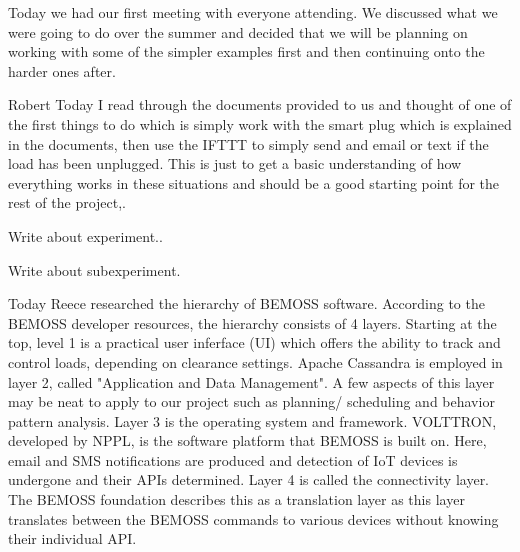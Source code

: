 \documentclass[fontsize=11pt, %
                             paper=letter, %
                             twoside, %
                             captions=tableheading,
                             index=totoc,
                             hyperref]{labbook}
\begin{document}
\begin{addmargin}[0cm]{0cm} %

\pagestyle{scrheadings} %




Today we had our first meeting with everyone attending. We discussed what we were going to do over the summer and decided that we will be planning on working with some of the simpler examples first and then continuing onto the harder ones after.

Robert \newline 
Today I read through the documents provided to us and thought of one of the first things to do which is simply work with the smart plug which is explained in the documents, then use the IFTTT to simply send and email or text if the load has been unplugged. This is just to get a basic understanding of how everything works in these situations and should be a good starting point for the rest of the project,.


Write about experiment..




Write about subexperiment. 

 
\end{addmargin}

Today Reece researched the hierarchy of BEMOSS software. According to the BEMOSS developer resources, the hierarchy consists of 4 layers. Starting at the top, level 1 is a practical user inferface (UI) which offers the ability to track and control loads, depending on clearance settings. Apache Cassandra is employed in layer 2, called "Application and Data Management". A few aspects of this layer may be neat to apply to our project such as planning/ scheduling and behavior pattern analysis. Layer 3 is the operating system and framework. VOLTTRON, developed by NPPL, is the software platform that BEMOSS is  built on. Here, email and SMS notifications are produced and detection of IoT devices is undergone and their APIs determined. Layer 4 is called the connectivity layer. The BEMOSS foundation describes this as a translation layer as this layer translates between the BEMOSS commands to various devices without knowing their individual API. 
\end{document}
